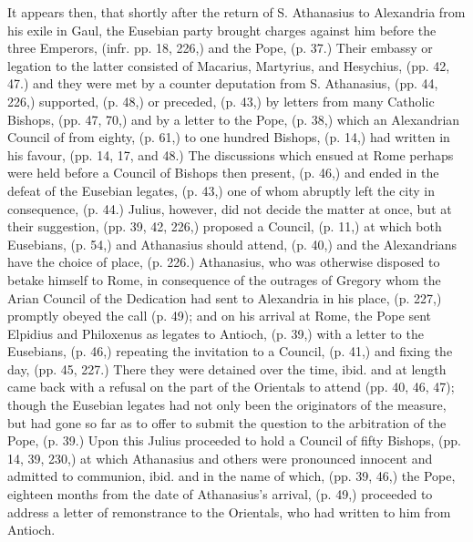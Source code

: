 It appears then, that shortly
after the return of S. Athanasius to Alexandria from his exile in
Gaul, the Eusebian party brought charges against him before the three
Emperors, (infr. pp. 18, 226,) and the Pope, (p. 37.) Their embassy or
legation to the latter consisted of Macarius, Martyrius, and Hesychius, (pp. 42, 47.) and they were met by a counter deputation
from S. Athanasius, (pp. 44, 226,) supported, (p. 48,) or preceded,
(p. 43,) by letters from many Catholic Bishops, (pp. 47, 70,) and by a
letter to the Pope, (p. 38,) which an Alexandrian Council of from
eighty, (p. 61,) to one hundred Bishops, (p. 14,) had written in his
favour, (pp. 14, 17, and 48.) The discussions which ensued at Rome
perhaps were held before a Council of Bishops then present, (p. 46,)
and ended in the defeat of the Eusebian legates, (p. 43,) one of whom
abruptly left the city in consequence, (p. 44.) Julius, however, did
not decide the matter at once, but at their suggestion, (pp. 39, 42,
226,) proposed a Council, (p. 11,) at which both Eusebians, (p. 54,)
and Athanasius should attend, (p. 40,) and the Alexandrians have the
choice of place, (p. 226.) Athanasius, who was otherwise disposed to
betake himself to Rome, in consequence of the outrages of Gregory whom
the Arian Council of the Dedication had sent to Alexandria in his
place, (p. 227,) promptly obeyed the call (p. 49); and on his arrival
at Rome, the Pope sent Elpidius and Philoxenus as legates to Antioch,
(p. 39,) with a letter to the Eusebians, (p. 46,) repeating the
invitation to a Council, (p. 41,) and fixing the day, (pp. 45, 227.)
There they were detained over the time, ibid. and at length came back
with a refusal on the part of the Orientals to attend (pp. 40, 46,
47); though the Eusebian legates had not only been the originators of
the measure, but had gone so far as to offer to submit the question to
the arbitration of the Pope, (p. 39.) Upon this Julius proceeded to
hold a Council of fifty Bishops, (pp. 14, 39, 230,) at which
Athanasius and others were pronounced innocent and admitted to
communion, ibid. and in the name of which, (pp. 39, 46,) the Pope,
eighteen months from the date of Athanasius's arrival, (p. 49,)
proceeded to address a letter of remonstrance to the Orientals, who
had written to him from Antioch.

